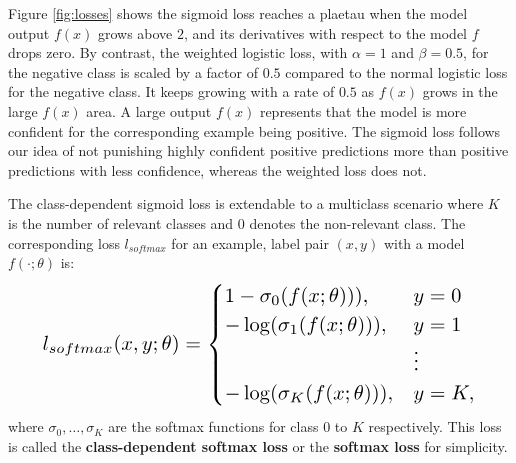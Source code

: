 Figure \ref{fig:losses} shows the sigmoid loss reaches a plaetau when the model output $f(x)$ grows above $2$, and its derivatives with respect to the model $f$ drops zero.
By contrast, the weighted logistic loss, with $\alpha=1$ and $\beta=0.5$, for the negative class is scaled by a factor of $0.5$ compared to the normal logistic loss for the negative class.
It keeps growing with a rate of $0.5$ as $f(x)$ grows in the large $f(x)$ area.
A large output $f(x)$ represents that the model is more confident for the corresponding example being positive.
The sigmoid loss follows our idea of not punishing highly confident positive predictions more than positive predictions with less confidence, whereas the weighted loss does not.

The class-dependent sigmoid loss is extendable to a multiclass scenario where $K$ is the number of relevant classes and $0$ denotes the non-relevant class.
The corresponding loss $l_{softmax}$ for an example, label pair $(x,y)$ with a model $f(\cdot;\theta)$ is:
\begin{eqnarray}
\resizebox{0.9\columnwidth}{!}{$
l_{softmax}(x, y; \theta) =
  \begin{cases}
    1 - \sigma_0(f(x;\theta))), & y = 0 \\
    - \log (\sigma_1(f(x;\theta))), & y = 1 \\
                                   & \vdots \\
    - \log (\sigma_K(f(x;\theta))), & y = K,
  \end{cases}
  $}
\end{eqnarray}
where $\sigma_0, \dots, \sigma_K$ are the softmax functions for class $0$ to $K$ respectively.
This loss is called the \textbf{class-dependent softmax loss} or the \textbf{softmax loss} for simplicity.

